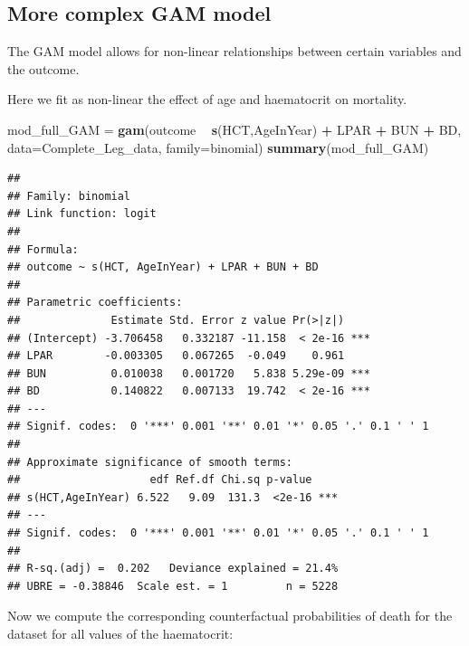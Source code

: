 \documentclass[]{article}
\newenvironment{Shaded}{\begin{snugshade}}{\end{snugshade}}
\newcommand{\KeywordTok}[1]{\textcolor[rgb]{0.13,0.29,0.53}{\textbf{#1}}}
\newcommand{\DataTypeTok}[1]{\textcolor[rgb]{0.13,0.29,0.53}{#1}}
\newcommand{\StringTok}[1]{\textcolor[rgb]{0.31,0.60,0.02}{#1}}
\newcommand{\OperatorTok}[1]{\textcolor[rgb]{0.81,0.36,0.00}{\textbf{#1}}}
\newcommand{\NormalTok}[1]{#1}
\begin{document}
\subsection{More complex GAM model}\label{more-complex-gam-model}

The GAM model allows for non-linear relationships between certain
variables and the outcome.

Here we fit as non-linear the effect of age and haematocrit on
mortality.

\begin{Shaded}
\begin{Highlighting}[]
\NormalTok{mod_full_GAM =}\StringTok{ }\KeywordTok{gam}\NormalTok{(outcome }\OperatorTok{~}\StringTok{ }\KeywordTok{s}\NormalTok{(HCT,AgeInYear) }\OperatorTok{+}\StringTok{ }\NormalTok{LPAR }\OperatorTok{+}\StringTok{ }\NormalTok{BUN }\OperatorTok{+}\StringTok{ }\NormalTok{BD,}
               \DataTypeTok{data=}\NormalTok{Complete_Leg_data, }\DataTypeTok{family=}\NormalTok{binomial)}
\KeywordTok{summary}\NormalTok{(mod_full_GAM)}
\end{Highlighting}
\end{Shaded}

\begin{verbatim}
## 
## Family: binomial 
## Link function: logit 
## 
## Formula:
## outcome ~ s(HCT, AgeInYear) + LPAR + BUN + BD
## 
## Parametric coefficients:
##              Estimate Std. Error z value Pr(>|z|)    
## (Intercept) -3.706458   0.332187 -11.158  < 2e-16 ***
## LPAR        -0.003305   0.067265  -0.049    0.961    
## BUN          0.010038   0.001720   5.838 5.29e-09 ***
## BD           0.140822   0.007133  19.742  < 2e-16 ***
## ---
## Signif. codes:  0 '***' 0.001 '**' 0.01 '*' 0.05 '.' 0.1 ' ' 1
## 
## Approximate significance of smooth terms:
##                    edf Ref.df Chi.sq p-value    
## s(HCT,AgeInYear) 6.522   9.09  131.3  <2e-16 ***
## ---
## Signif. codes:  0 '***' 0.001 '**' 0.01 '*' 0.05 '.' 0.1 ' ' 1
## 
## R-sq.(adj) =  0.202   Deviance explained = 21.4%
## UBRE = -0.38846  Scale est. = 1         n = 5228
\end{verbatim}

Now we compute the corresponding counterfactual probabilities of death
for the dataset for all values of the haematocrit:
\end{document}

